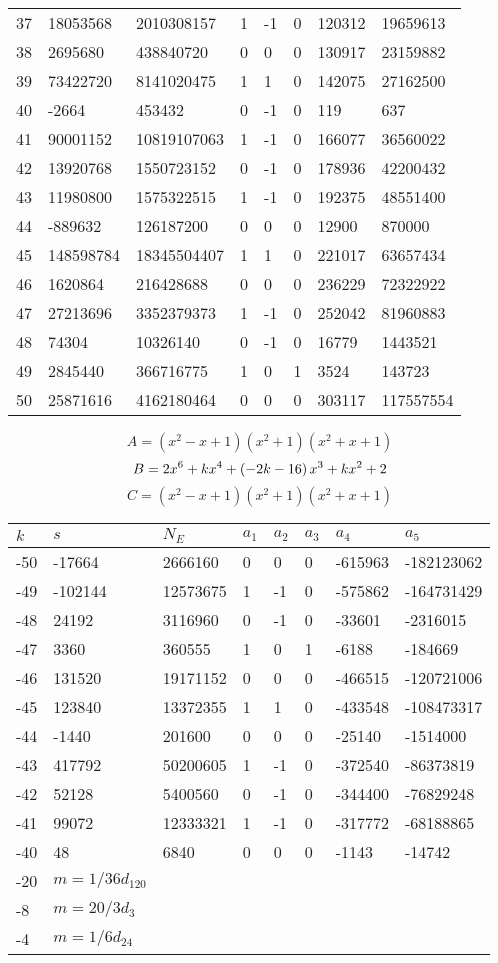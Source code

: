 \documentclass{amsart}
\begin{document}
\begin{longtable}{|l|l|l|lllll|}
37&18053568&2010308157&1&-1&0&120312&19659613\\
38&2695680&438840720&0&0&0&130917&23159882\\
39&73422720&8141020475&1&1&0&142075&27162500\\
40&-2664&453432&0&-1&0&119&637\\
41&90001152&10819107063&1&-1&0&166077&36560022\\
42&13920768&1550723152&0&-1&0&178936&42200432\\
43&11980800&1575322515&1&-1&0&192375&48551400\\
44&-889632&126187200&0&0&0&12900&870000\\
45&148598784&18345504407&1&1&0&221017&63657434\\
46&1620864&216428688&0&0&0&236229&72322922\\
47&27213696&3352379373&1&-1&0&252042&81960883\\
48&74304&10326140&0&-1&0&16779&1443521\\
49&2845440&366716775&1&0&1&3524&143723\\
50&25871616&4162180464&0&0&0&303117&117557554\\
\hline
\end{longtable}
$$A=(x^2
 - x
 + 1)(x^2
 + 1)(x^2
 + x
 + 1)$$
$$B=2\*x^6
 + k\*x^4
 + \left(-2\*k
 - 16\right) \*x^3
 + k\*x^2
 + 2$$
$$C=(x^2
 - x
 + 1)(x^2
 + 1)(x^2
 + x
 + 1)$$
\begin{longtable}{|l|l|l|lllll|}
\hline
$k$ & $s$ & $N_E$ & $a_1$ & $a_2$ & $a_3$ & $a_4$ & $a_5$\\
\hline
-50&-17664&2666160&0&0&0&-615963&-182123062\\
-49&-102144&12573675&1&-1&0&-575862&-164731429\\
-48&24192&3116960&0&-1&0&-33601&-2316015\\
-47&3360&360555&1&0&1&-6188&-184669\\
-46&131520&19171152&0&0&0&-466515&-120721006\\
-45&123840&13372355&1&1&0&-433548&-108473317\\
-44&-1440&201600&0&0&0&-25140&-1514000\\
-43&417792&50200605&1&-1&0&-372540&-86373819\\
-42&52128&5400560&0&-1&0&-344400&-76829248\\
-41&99072&12333321&1&-1&0&-317772&-68188865\\
-40&48&6840&0&0&0&-1143&-14742\\
-20&$m=1/36d_{120}$&&\multicolumn{5}{c|}{}\\
-8&$m=20/3d_{3}$&&\multicolumn{5}{c|}{}\\
-4&$m=1/6d_{24}$&&\multicolumn{5}{c|}{}\\
\hline
\end{longtable}
\end{document}
